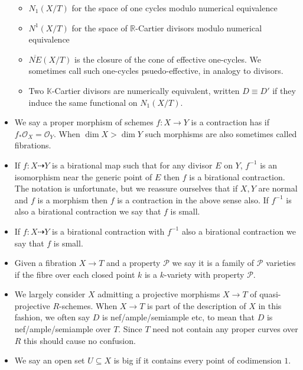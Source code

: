 \documentclass[a4paper,12pt]{book}
\newcommand{\ox}[1][X]{\mathcal{O}_{#1}}
\begin{document}
\begin{itemize}
\begin{itemize}
			\item $N_{1}(X/T)$ for the space of one cycles modulo numerical equivalence
			\item $N^{1}(X/T)$ for the space of $\mathbb{R}$-Cartier divisors modulo numerical equivalence
			\item $\overline{NE}(X/T)$ is the closure of the cone of effective one-cycles. We sometimes call such one-cycles psuedo-effective, in analogy to divisors.
			\item Two $\mathbb{K}$-Cartier divisors are numerically equivalent, written $D \equiv D'$ if they induce the same functional on $N_{1}(X/T)$.
		\end{itemize}
		\item We say a proper morphism of schemes $f\colon X \to Y$ is a contraction has if $f_{*}\ox=\ox[Y]$. When $\dim X > \dim Y$ such morphisms are also sometimes called fibrations.
		\item If $f \colon X \dashrightarrow Y$ is a birational map such that for any divisor $E$ on $Y$, $f^{-1}$ is an isomorphism near the generic point of $E$ then $f$ is a birational contraction. The notation is unfortunate, but we reassure ourselves that if $X,Y$ are normal and $f$ is a morphism then $f$ is a contraction in the above sense also. If $f^{-1}$ is also a birational contraction we say that $f$ is small. 
		\item If $f \colon X \dashrightarrow Y$ is a birational contraction with $f^{-1}$ also a birational contraction we say that $f$ is small.
		\item Given a fibration $X \to T$ and a property $\mathcal{P}$ we say it is a family of $\mathcal{P}$ varieties if the fibre over each closed point $k$ is a $k$-variety with property $\mathcal{P}$.
		\item We largely consider $X$ admitting a projective morphisms $X\to T$ of quasi-projective $R$-schemes. When $X \to T$ is part of the description of $X$ in this fashion, we often say $D$ is nef/ample/semiample etc, to mean that $D$ is nef/ample/semiample over $T$. Since $T$ need not contain any proper curves over $R$ this should cause no confusion.
		\item We say an open set $U \subseteq X$ is big if it contains every point of codimension $1$.
		
		
		
	\end{itemize}
	
\end{document}
